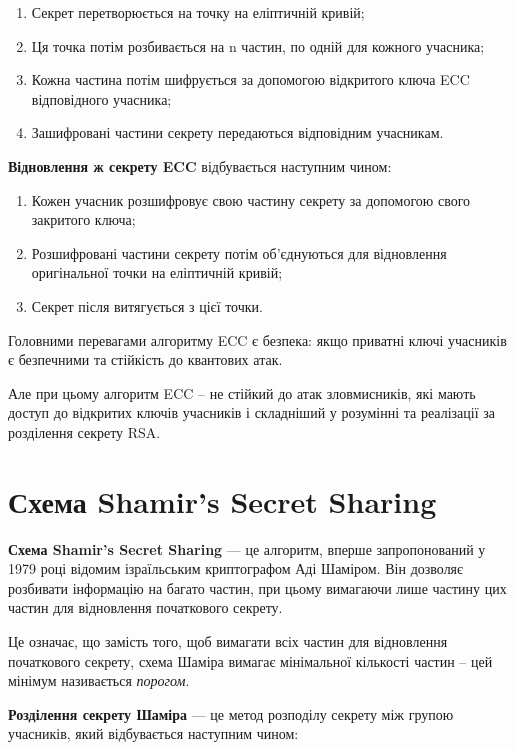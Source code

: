 \begin{enumerate}
    \item Секрет перетворюється на точку на еліптичній кривій;
    \item Ця точка потім розбивається на n частин, по одній для кожного учасника;
    \item Кожна частина потім шифрується за допомогою відкритого ключа ECC відповідного учасника;
    \item Зашифровані частини секрету передаються відповідним учасникам.
\end{enumerate}

\vspace{0.5cm}
\textbf{Відновлення ж секрету ECC} відбувається наступним чином:

\begin{enumerate}
    \item Кожен учасник розшифровує свою частину секрету за допомогою свого закритого ключа;
    \item Розшифровані частини секрету потім об’єднуються для відновлення оригінальної точки на еліптичній кривій;
    \item Секрет після витягується з цієї точки.
\end{enumerate}

\vspace{0.5cm}
Головними перевагами алгоритму ECC є безпека: якщо приватні ключі учасників є безпечними та стійкість до квантових атак.

Але при цьому алгоритм ECC -- не стійкий до атак зловмисників, які мають доступ до відкритих ключів учасників і складніший у розумінні та реалізації за розділення секрету RSA.

\section{Схема Shamir's Secret Sharing}
\textbf{Схема Shamir's Secret Sharing} --- це алгоритм, вперше запропонований у 1979 році відомим ізраїльським криптографом Аді Шаміром. Він дозволяє розбивати інформацію на багато частин, при цьому вимагаючи лише частину цих частин для відновлення початкового секрету.

Це означає, що замість того, щоб вимагати всіх частин для відновлення початкового секрету, схема Шаміра вимагає мінімальної кількості частин -- цей мінімум називається \textit{порогом}.

\textbf{Розділення секрету Шаміра} --- це метод розподілу секрету між групою учасників, який відбувається наступним чином:

